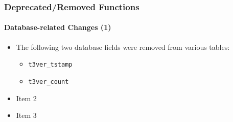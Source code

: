 %

\begin{frame}[fragile]
	\frametitle{Deprecated/Removed Functions}
	\framesubtitle{Database-related Changes (1)}

	\begin{itemize}
		\item The following two database fields were removed from various tables:
			\begin{itemize}\smaller
				\item \texttt{t3ver\_tstamp}
				\item \texttt{t3ver\_count}
			\end{itemize}\normalsize
			\vspace{0.4cm}

		\item Item 2
		\item Item 3
	\end{itemize}

\end{frame}

